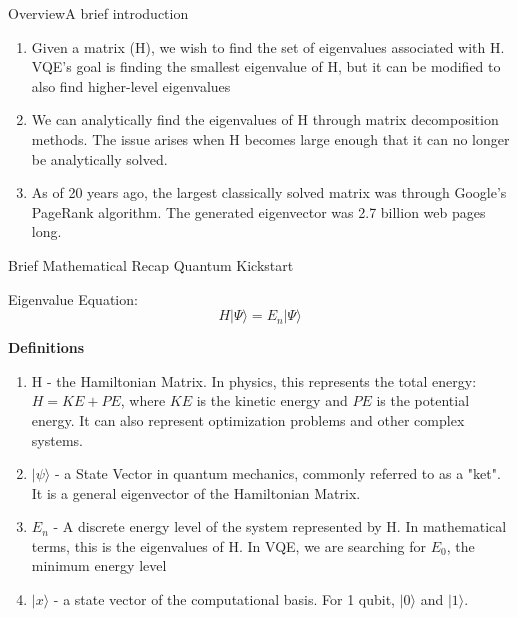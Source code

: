 \def\OtherAuthors{ and Jonah Sachs}


\begin{frame}{Overview}{A brief introduction}
\begin{enumerate}
    \item Given a matrix (H), we wish to find the set of eigenvalues associated with H. VQE's goal is  finding the smallest eigenvalue of H, but it can be modified to also find higher-level eigenvalues
    \vspace{5mm}
    \item We can analytically find the eigenvalues of H through matrix decomposition methods. The issue arises when H becomes large enough that it can no longer be analytically solved.
    \vspace{5mm}
    \item As of 20 years ago, the largest classically solved matrix was through Google's PageRank algorithm. The generated eigenvector was 2.7 billion web pages long.
    
\end{enumerate}
\end{frame}

\begin{frame}{Brief Mathematical Recap} {Quantum Kickstart}

Eigenvalue Equation: $$H | \Psi \rangle = E_n |\Psi \rangle$$

\textbf{Definitions}
\begin{enumerate}
    \item H - the Hamiltonian Matrix. In physics, this represents the total energy: \( H = KE + PE \), where \( KE \) is the kinetic energy and \( PE \) is the potential energy. It can also represent optimization problems and other complex systems. 
    \vspace{2mm}
    \item \textbf{$| \psi \rangle$} - a State Vector in quantum mechanics, commonly referred to as a "ket". It is a general eigenvector of the Hamiltonian Matrix. 
    \vspace{2mm}
    \item $E_n$ - A discrete energy level of the system represented by H. In mathematical terms, this is the eigenvalues of H. In VQE, we are searching for $E_0$, the minimum energy level
    \vspace{2mm}
    \item $| x \rangle$ - a state vector of the computational basis. For 1 qubit, $| 0 \rangle$ and $| 1 \rangle$.
\end{enumerate}

\end{frame}

